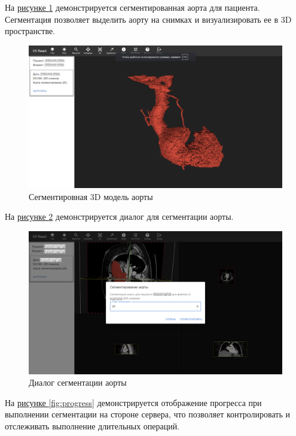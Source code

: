 На \hyperref[fig:aorta]{рисунке \ref*{fig:aorta}} демонстрируется сегментированная аорта для пациента. Сегментация позволяет выделить аорту на снимках и визуализировать ее в 3D пространстве.

\begin{figure}[H]
    \centering
    \includegraphics[]{images/chap3/aorta.png}
    \caption{Сегментировная 3D модель аорты}
    \label{fig:aorta}
\end{figure}

На \hyperref[fig:dialog]{рисунке \ref*{fig:dialog}} демонстрируется диалог для сегментации аорты.

\begin{figure}[h!]
    \centering
    \includegraphics[]{images/chap3/dialog.png}
    \caption{Диалог сегментации аорты}
    \label{fig:dialog}
\end{figure}

На \hyperref[fig:progress]{рисунке \ref*{fig:progress}} демонстрируется отображение прогресса при выполнении сегментации на стороне сервера, что позволяет контролировать и отслеживать выполнение длительных операций.

